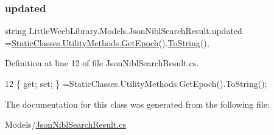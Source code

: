 \subsubsection{\texorpdfstring{updated}{updated}}
{\footnotesize\ttfamily string Little\+Weeb\+Library.\+Models.\+Json\+Nibl\+Search\+Result.\+updated =\mbox{\hyperlink{class_little_weeb_library_1_1_static_classes_1_1_utility_methods_a12336d9e64983ddabaad8950486fafb2}{Static\+Classes.\+Utility\+Methods.\+Get\+Epoch}}().\mbox{\hyperlink{class_little_weeb_library_1_1_models_1_1_json_nibl_search_result_ad0ccabee81ba5885580d9516f4db4099}{To\+String}}()\hspace{0.3cm}{\ttfamily [get]}, {\ttfamily [set]}}



Definition at line 12 of file Json\+Nibl\+Search\+Result.\+cs.


\begin{DoxyCode}
12 \{ \textcolor{keyword}{get}; \textcolor{keyword}{set}; \} =StaticClasses.UtilityMethods.GetEpoch().ToString();
\end{DoxyCode}


The documentation for this class was generated from the following file\+:\begin{DoxyCompactItemize}
\item 
Models/\mbox{\hyperlink{_json_nibl_search_result_8cs}{Json\+Nibl\+Search\+Result.\+cs}}\end{DoxyCompactItemize}
